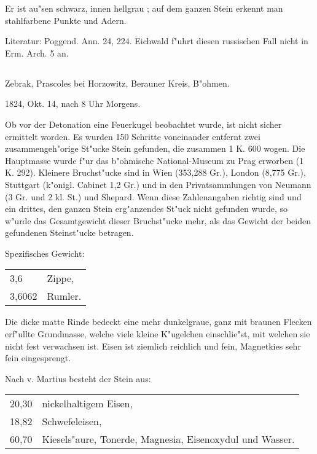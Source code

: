 \documentclass[a4paper, 11pt, oneside]{article}
\begin{document}
Er ist au"sen schwarz, innen hellgrau ; auf dem ganzen Stein erkennt man stahlfarbene Punkte und Adern.

\normalsize
Literatur: Poggend. Ann. 24, 224. Eichwald f"uhrt diesen russischen Fall nicht in Erm. Arch. 5 an.

\subsection{}
\LARGE
\paragraph{}
Zebrak, Prascoles bei Horzowitz, Berauner Kreis, B"ohmen.

1824, Okt. 14, nach 8 Uhr Morgens.

Ob vor der Detonation eine Feuerkugel beobachtet wurde, ist nicht sicher ermittelt worden. Es wurden 150 Schritte voneinander entfernt zwei zusammengeh"orige St"ucke Stein gefunden, die zusammen 1 K. 600 wogen. Die Hauptmasse wurde f"ur das b"ohmische National-Museum zu Prag erworben (1 K. 292). Kleinere Bruchst"ucke sind in Wien (353,288 Gr.), London (8,775 Gr.), Stuttgart (k"onigl. Cabinet 1,2 Gr.) und in den Privatsammlungen von Neumann (3 Gr. und 2 kl. St.) und Shepard. Wenn diese Zahlenangaben richtig sind und ein drittes, den ganzen Stein erg"anzendes St"uck nicht gefunden wurde, so w"urde das Gesamtgewicht dieser Bruchst"ucke mehr, als das Gewicht der beiden gefundenen Steinst"ucke betragen.

Spezifisches Gewicht:
\begin{table}[!ht]
    \centering\swabfamily\Large
    \begin{tabular}{l l}
        3,6 & Zippe,\\
        3,6062 & Rumler.
    \end{tabular}
\end{table}

Die dicke matte Rinde bedeckt eine mehr dunkelgraue, ganz mit braunen Flecken erf"ullte Grundmasse, welche viele kleine K"ugelchen einschlie"st, mit welchen sie nicht fest verwachsen ist. Eisen ist ziemlich reichlich und fein, Magnetkies sehr fein eingesprengt.

Nach v. Martius besteht der Stein aus:
\begin{table}[!ht]
    \centering\swabfamily\Large
    \begin{tabular}{l p{50mm}}
        20,30 & nickelhaltigem Eisen, \\
        18,82 & Schwefeleisen, \\
        60,70 & Kiesels"aure, Tonerde, Magnesia, Eisenoxydul und Wasser. \\
    \end{tabular}
\end{table} 
\end{document}
